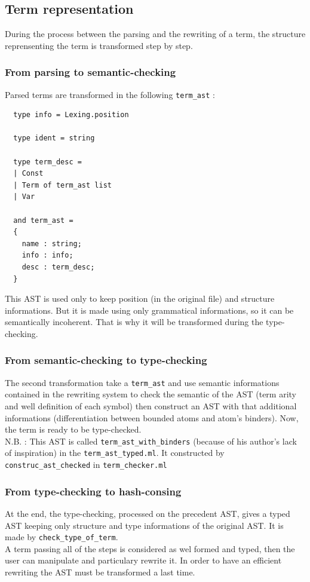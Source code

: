 \documentclass[12pt,a4paper]{article}
\begin{document}
\subsection{Term representation}
\label{data-term}
During the process between the parsing and the rewriting of a term, the
structure reprensenting the term is transformed step by step.

\subsubsection{From parsing to semantic-checking}
Parsed terms are transformed in the following \verb?term_ast? :
\begin{lstlisting}
  type info = Lexing.position

  type ident = string

  type term_desc =
  | Const
  | Term of term_ast list
  | Var

  and term_ast =
  {
    name : string;
    info : info;
    desc : term_desc;
  }
\end{lstlisting}

This AST is used only to keep position (in the original file) and structure
informations.
But it is made using only grammatical informations, so it can be
semantically incoherent. That is why it will be transformed during the
type-checking.

\subsubsection{From semantic-checking to type-checking}
The second transformation take a \verb?term_ast? and use semantic informations
contained in the rewriting system to check the semantic of the AST (term
arity and well definition of each symbol)  then
construct an AST with that additional informations (differentiation between
bounded atoms and atom's binders). Now, the term is ready to be type-checked.
\\
N.B. : This AST is called \verb?term_ast_with_binders? (because of his
author's lack of inspiration) in the \verb?term_ast_typed.ml?.
It constructed by \verb?construc_ast_checked? in \verb?term_checker.ml?

\subsubsection{From type-checking to hash-consing}
At the end, the type-checking, processed on the precedent AST, gives a
typed AST keeping only structure and type informations of the original AST.
It is made by \verb?check_type_of_term?.
\\
A term passing all of the steps is considered as wel formed and typed, then
the user can manipulate and particulary rewrite it. In order to have an
efficient rewriting the AST must be transformed a last time.
\end{document}
